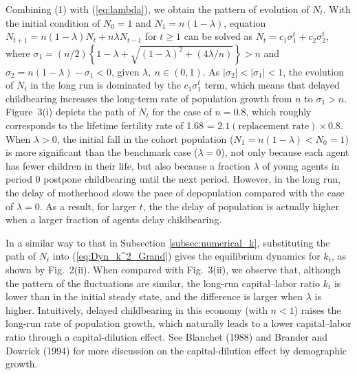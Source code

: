 \documentclass[nogrid]{MBE}%
\begin{document}
{Combining (1) with (\ref{eq:lambda}), we obtain the pattern of evolution of $N_{t}$. {With the
initial condition of $N_{0}=1$ and $N_{1}=n(1-\lambda)$, equation $N_{t+1}=n \left(  1-\lambda
\right)  N_{t}+n \lambda N_{t-1}$ for $t\geq1$ can be solved as $N_{t}=c_{1} \sigma_{1}^{t} +
c_{2} \sigma_{2}^{t}$, where $\sigma_{1}=(n/2)\left\{ 1-\lambda+
\sqrt{(1-\lambda)^{2}+(4\lambda/n)}\right\}  >n$ and $\sigma _{2}=n(1-\lambda)-\sigma_{1}<0$,
given $\lambda,\ n \in(0,1)$. As $|\sigma _{2}|<|\sigma_{1}|<1$, the evolution of $N_{t}$ in the
long run is dominated by the $c_{1} \sigma_{1}^{t}$ term, which means that delayed childbearing
increases the long-term rate of population growth from $n$ to $\sigma_{1}>n$. \label{fn:decline}}
Figure~3(i) depicts the path of $N_{t}$ for the case of $n=0.8$, which roughly corresponds to the
lifetime fertility rate of 1.68 = $2.1 (\text{replacement rate}) \times0.8$. When $\lambda>0$, the
initial fall in the cohort population ($N_{1}=n(1-\lambda)< N_{0} =1$) is more significant than
the benchmark case ($\lambda=0$), not only because each agent has fewer children in their life,
but also because a fraction $\lambda$ of young agents in period 0 postpone childbearing until the
next period. However, in the long run, the delay of motherhood slows the pace of depopulation
compared with the case of $\lambda=0$. As a result, for larger $t$, the the delay of  population
is actually higher when a larger fraction of agents delay childbearing.

In a similar way to that in Subsection \ref{subsec:numerical_k}, substituting the path of $N_{t}$
into (\ref{eq:Dyn_k^2_Grand}) gives the equilibrium dynamics for $k_{t}$, as shown by Fig.~2(ii).
When compared with Fig.~3(ii), we observe that, although the pattern of the fluctuations are
similar, the long-run capital--labor ratio $k_{t}$ is lower than in the initial steady state, and
the difference is larger when $\lambda$ is higher. Intuitively, delayed childbearing in this
economy (with $n<1$) raises the long-run rate of population growth, which naturally leads to a
lower capital--labor ratio through a capital-dilution effect. {See Blanchet (1988) and Brander and
Dowrick (1994) for more discussion on the capital-dilution effect by demographic growth.}


}
\end{document}

